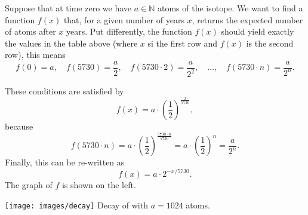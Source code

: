 \begin{example}
	Suppose that at time zero we have $a\in\mathbb N$ atoms of the  isotope.
	We want to find a function $f\left(x\right)$ that, for a given number of years $x$, returns the expected number of  atoms after $x$ years.
	Put differently, the function $f\left(x\right)$ should yield exactly the values in the table above (where $x$ si the first row and $f\left(x\right)$ is the second row), this means
	\begin{equation*}
		f\left(0\right)=a,\quad
		f\left(5730\right)=\frac{a}{2},\quad
		f\left(5730\cdot 2\right)=\frac{a}{2^2},\quad\ldots,\quad
		f\left(5730\cdot n\right)=\frac{a}{2^n}.
	\end{equation*}
	\begin{minipage}{0.48\textwidth}
		These conditions are satisfied by
		\begin{equation*}
			f\left(x\right)=a\cdot\left(\frac{1}{2}\right)^{\tfrac{x}{5730}},
		\end{equation*}
		because
		\begin{equation*}
			f\left(5730\cdot n\right)=a\cdot\left(\frac{1}{2}\right)^{\tfrac{5730\cdot n}{5730}}
			=a\cdot\left(\frac{1}{2}\right)^n
			=\frac{a}{2^n}.
		\end{equation*}
		Finally, this can be re-written as
		\begin{equation*}
			f\left(x\right)=a\cdot 2^{-x/5730}.
		\end{equation*}
		The graph of $f$ is shown on the left.
	\end{minipage}\hfill
	\begin{minipage}{0.48\textwidth}
			\centering
			\texttt{[image: images/decay]}\hfill
			Decay of  with $a=1024$ atoms.
	\end{minipage}
\end{example}